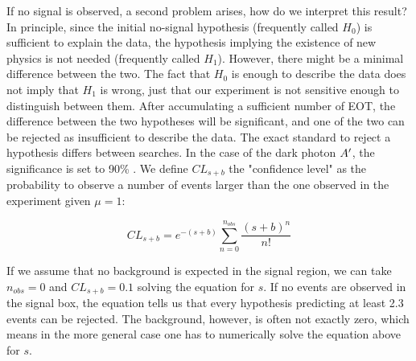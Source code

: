 If no signal is observed, a second problem arises, how do we interpret this result? In principle, since the initial no-signal hypothesis (frequently called $H_0$) is sufficient to explain the data, the hypothesis implying the existence of new physics is not needed (frequently called $H_1$). However, there might be a minimal difference between the two. The fact that $H_0$ is enough to describe the data does not imply that $H_1$ is wrong, just that our experiment is not sensitive enough to distinguish between them. After accumulating a sufficient number of EOT, the difference between the two hypotheses will be significant, and one of the two can be rejected as insufficient to describe the data.
The exact standard to reject a hypothesis differs between searches. In the case of the dark photon $A'$, the significance is set to 90\% \cite{battaglieri2017cosmic}. We define $CL_{s+b}$ the "confidence level" as the probability to observe a number of events larger than the one observed in the experiment given $\mu = 1$:

\begin{equation}
  \label{eq:confidence-level-poisson}
  CL_{s+b} = e^{-(s+b)}\sum^{n_{obs}}_{n=0} \frac{(s+b)^n}{n!}
\end{equation}

If we assume that no background is expected in the signal region, we can take $n_{obs} = 0$ and $CL_{s+b} = 0.1$ solving the equation for $s$. If no events are observed in the signal box, the equation tells us that every hypothesis predicting at least 2.3 events can be rejected. The background, however, is often not exactly zero, which means in the more general case one has to numerically solve the equation above for $s$.

